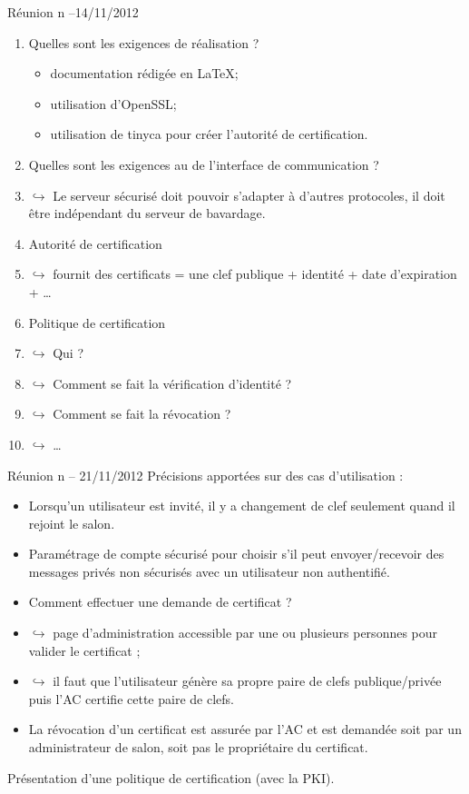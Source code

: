 \documentclass[a4paper,11pt,french]{article}
\begin{document}
\begin{paragraph}{Réunion n --14/11/2012}
\begin{enumerate}
\item Quelles sont les exigences de réalisation ?
\begin{itemize}
\item documentation rédigée en \LaTeX;
\item utilisation d'OpenSSL;
\item utilisation de tinyca pour créer l'autorité de certification.
\end{itemize}

\item Quelles sont les exigences au de l'interface de communication ?
\item [] $\hookrightarrow$ Le serveur sécurisé doit pouvoir s'adapter à d'autres protocoles, il doit être indépendant du serveur de bavardage.

\item Autorité de certification
\item [] $\hookrightarrow$ fournit des certificats = une clef publique + identité + date d'expiration + \dots

\item Politique de certification
\item [] $\hookrightarrow$ Qui ?
\item [] $\hookrightarrow$ Comment se fait la vérification d'identité ?
\item [] $\hookrightarrow$ Comment se fait la révocation ?
\item [] $\hookrightarrow$ \dots
\end{enumerate}
\end{paragraph}

\begin{paragraph}{Réunion n -- 21/11/2012}
Précisions apportées sur des cas d'utilisation :
\begin{itemize}
\item Lorsqu'un utilisateur est invité, il y a changement de clef seulement quand il rejoint le salon.
\item Paramétrage de compte sécurisé pour choisir s'il peut envoyer/recevoir des messages privés non sécurisés avec un utilisateur non authentifié.
\item Comment effectuer une demande de certificat ?
\item [] $\hookrightarrow$  page d'administration accessible par une ou plusieurs personnes pour valider le certificat ;
\item [] $\hookrightarrow$ il faut que l'utilisateur génère sa propre paire de clefs publique/privée puis l'AC certifie cette paire de clefs.
\item La révocation d'un certificat est assurée par l'AC et est demandée soit par un administrateur de salon, soit pas le propriétaire du certificat.
\end{itemize}
Présentation d'une politique de certification (avec la PKI).
\end{paragraph}
\end{document}
